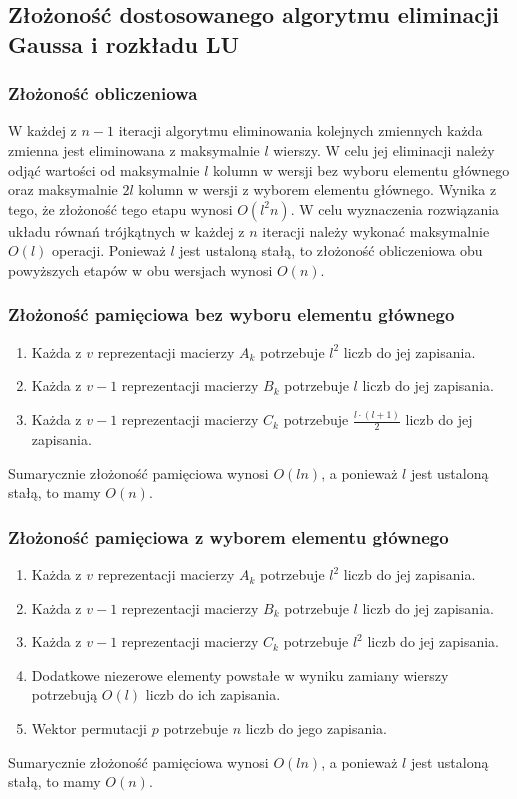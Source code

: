 \documentclass{article}
\begin{document}
\subsection{Złożoność dostosowanego algorytmu eliminacji Gaussa i rozkładu LU}

\subsubsection{Złożoność obliczeniowa}
W każdej z $n-1$ iteracji algorytmu eliminowania kolejnych zmiennych każda zmienna jest eliminowana z maksymalnie $l$ wierszy.
W celu jej eliminacji należy odjąć wartości od maksymalnie $l$ kolumn w wersji bez wyboru elementu głównego oraz maksymalnie $2l$ kolumn w wersji z wyborem elementu głównego.
Wynika z tego, że złożoność tego etapu wynosi $O(l^2n)$. 
W celu wyznaczenia rozwiązania układu równań trójkątnych w każdej z $n$ iteracji należy wykonać maksymalnie $O(l)$ operacji.
Ponieważ $l$ jest ustaloną stałą, to złożoność obliczeniowa obu powyższych etapów w obu wersjach wynosi $O(n)$.

\subsubsection{Złożoność pamięciowa bez wyboru elementu głównego}
\begin{enumerate}
    \item Każda z $v$ reprezentacji macierzy $A_k$ potrzebuje $l^2$ liczb do jej zapisania.
    \item Każda z $v-1$ reprezentacji macierzy $B_k$ potrzebuje $l$ liczb do jej zapisania.
    \item Każda z $v-1$ reprezentacji macierzy $C_k$ potrzebuje $\frac{l \cdot (l+1)}{2}$ liczb do jej zapisania.
\end{enumerate}
Sumarycznie złożoność pamięciowa wynosi $O(ln)$, a ponieważ $l$ jest ustaloną stałą, to mamy $O(n)$.

\subsubsection{Złożoność pamięciowa z wyborem elementu głównego}
\begin{enumerate}
    \item Każda z $v$ reprezentacji macierzy $A_k$ potrzebuje $l^2$ liczb do jej zapisania.
    \item Każda z $v-1$ reprezentacji macierzy $B_k$ potrzebuje $l$ liczb do jej zapisania.
    \item Każda z $v-1$ reprezentacji macierzy $C_k$ potrzebuje $l^2$ liczb do jej zapisania.
    \item Dodatkowe niezerowe elementy powstałe w wyniku zamiany wierszy potrzebują $O(l)$ liczb do ich zapisania.
    \item Wektor permutacji $p$ potrzebuje $n$ liczb do jego zapisania.
\end{enumerate}
Sumarycznie złożoność pamięciowa wynosi $O(ln)$, a ponieważ $l$ jest ustaloną stałą, to mamy $O(n)$.
\end{document}
